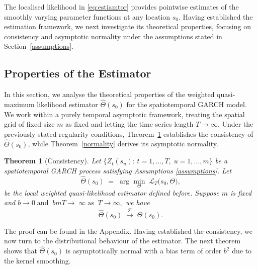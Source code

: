 \documentclass[fleqn,11pt]{article}
\newtheorem{theorem}{Theorem}
\begin{document}
The localised likelihood in \eqref{eq:estiamtor} provides pointwise estimates of the smoothly varying parameter functions at any location $s_0$. Having established the estimation framework, we next investigate its theoretical properties, focusing on consistency and asymptotic normality under the assumptions stated in Section~\ref{assumptions}.


 

\subsection{Properties of the Estimator}\label{sec:properties}

In this section, we analyse the theoretical properties of the weighted quasi-maximum likelihood estimator $\hat{\Theta}(s_0)$ for the spatiotemporal GARCH model. We work within a purely temporal asymptotic framework, treating the spatial grid of fixed size $m$ as fixed and letting the time series length $T \to \infty$. Under the previously stated regularity conditions, Theorem~\ref{consistency} establishes the consistency of $\hat{\Theta}(s_0)$, while Theorem~\ref{normality} derives its asymptotic normality.

\begin{theorem}[Consistency]\label{consistency}
Let \(\{Z_t(s_u):\,t=1,\dots,T,\;u=1,\dots,m\}\) be a spatiotemporal GARCH process satisfying Assumptions \ref{assumptions}.  Let
$$
\hat\Theta(s_0)
\;=\;
\arg\min_{\Theta}\;
\mathcal L_T\bigl(s_0,\Theta\bigr),
$$
be the local weighted quasi-likelihood estimator defined before. Suppose $m$ is fixed and $ b\rightarrow 0 \; \text{and}\; \;  bmT \rightarrow\;\infty \;  \text{as} \;  \;  T\rightarrow\infty,$
we have $$
\hat\Theta(s_0)\;\xrightarrow{\mathcal{P}}\;\Theta(s_0).
$$
\end{theorem}

The proof can be found in the Appendix. Having established the consistency, we now turn to the distributional behaviour of the estimator. The next theorem shows that $\hat\Theta(s_0)$ is asymptotically normal with a bias term of order $b^2$ due to the kernel smoothing.
 
\end{document}
